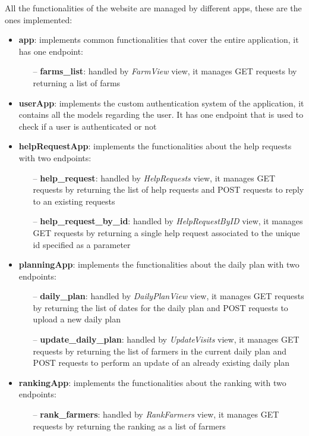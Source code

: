 \documentclass[table, 12pt]{article}
\begin{document}
All the functionalities of the website are managed by different apps, these are the ones implemented:
\begin{itemize}
    \item \textbf{app}: implements common functionalities that cover the entire application, it has one endpoint:
    \begin{itemize}
        \item[--] \textbf{farms\_list}: handled by \textit{FarmView} view, it manages GET requests by returning a list of farms
    \end{itemize}
    \item \textbf{userApp}: implements the custom authentication system of the application, it contains all the models regarding the user. It has one endpoint that is used to check if a user is authenticated or not
    \item \textbf{helpRequestApp}: implements the functionalities about the help requests with two endpoints:
    \begin{itemize}
        \item[--] \textbf{help\_request}: handled by \textit{HelpRequests} view, it manages GET requests by returning the list of help requests and POST requests to reply to an existing requests
        \item[--] \textbf{help\_request\_by\_id}: handled by \textit{HelpRequestByID} view, it manages GET requests by returning a single help request associated to the unique id specified as a parameter
    \end{itemize}
    \item \textbf{planningApp}: implements the functionalities about the daily plan with two endpoints:
    \begin{itemize}
        \item[--] \textbf{daily\_plan}: handled by \textit{DailyPlanView} view, it manages GET requests by returning the list of dates for the daily plan and POST requests to upload a new daily plan
        \item[--] \textbf{update\_daily\_plan}: handled by \textit{UpdateVisits} view, it manages GET requests by returning the list of farmers in the current daily plan and POST requests to perform an update of an already existing daily plan
    \end{itemize}
    \item \textbf{rankingApp}: implements the functionalities about the ranking with two endpoints:
    \begin{itemize}
        \item[--] \textbf{rank\_farmers}: handled by \textit{RankFarmers} view, it manages GET requests by returning the ranking as a list of farmers

\end{itemize}
\end{itemize}
\end{document}
